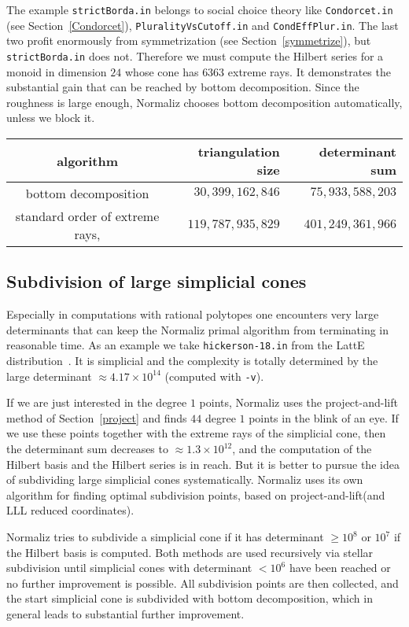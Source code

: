 The example \verb|strictBorda.in| belongs to social choice theory like \verb|Condorcet.in| (see Section~\ref{Condorcet}), \verb|PluralityVsCutoff.in| and \verb|CondEffPlur.in|. The last two profit enormously from symmetrization (see Section~\ref{symmetrize}), but \verb| strictBorda.in| does not. Therefore we must compute the Hilbert series for a monoid in dimension $24$ whose cone has $6363$ extreme rays. It demonstrates the substantial gain that can be reached by bottom decomposition. Since the roughness is large enough, Normaliz chooses bottom decomposition automatically, unless we block it.
\begin{center}
	\begin{tabular}{|c|r|r|}\hline
		algorithm	& triangulation size& determinant sum \\ \hline
		bottom decomposition& $30,399,162,846$ & $75,933,588,203$ \\ \hline
		standard order of extreme rays, \ttt{-o} & $119,787,935,829$ & $401,249,361,966$ \\ \hline
	\end{tabular}
\end{center}

\subsection{Subdivision of large simplicial cones}\label{subdiv}

Especially in computations with rational polytopes one encounters very large determinants that can keep the Normaliz primal algorithm from terminating in reasonable time. As an example we take \verb|hickerson-18.in| from the LattE distribution~\cite{LatInt}. It is simplicial and the complexity is totally determined by the large determinant $\approx 4.17\times 10^{14}$ (computed with \verb|-v|).

If we are just interested in the degree $1$ points, Normaliz uses the project-and-lift method of Section~\ref{project} and finds $44$ degree $1$ points in the blink of an eye. If we use these points together with the extreme rays of the simplicial cone, then the determinant sum decreases to $\approx 1.3\times 10^{12}$, and the computation of the Hilbert basis and the Hilbert series is in reach. But it is better to pursue the idea of subdividing large simplicial cones systematically. Normaliz
uses its own algorithm for finding optimal subdivision points, based on project-and-lift(and LLL reduced coordinates).

Normaliz tries to subdivide a simplicial cone if it has determinant $\ge 10^8$ or $10^7$ if the Hilbert basis is computed. Both methods are used recursively via stellar subdivision until simplicial cones with determinant $< 10^6$ have been reached or no further improvement is possible. All subdivision points are then collected, and the start simplicial cone is subdivided with bottom decomposition, which in general leads to substantial further improvement.

